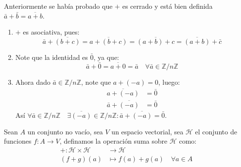 \begin{enefecto}
	Anteriormente se había probado que $+$ es cerrado y está bien definida $\bar{a} + \bar{b} = \overline{a+b}$.

	\begin{enumerate}[label=\roman*), font=\normalfont]
		\item $+$ es asociativa, pues:
		      \begin{equation*}
			      \bar{a} + \overline{(b+c)} = \overline{a+(b+c)} = \overline{(a+b)+c} = \overline{(a+b)} + \bar{c}
		      \end{equation*}
		\item Note que la identidad es $\bar{0}$, ya que:
		      \begin{equation*}
			      \bar{a} + \bar{0} = \overline{a+0} = \bar{a} \quad \forall \bar{a} \in \mathbb{Z}/n\mathbb{Z}
		      \end{equation*}
		\item Ahora dado $\bar{a} \in \mathbb{Z}/n\mathbb{Z}$, note que $a+(-a)=0$, luego:
		      \begin{align*}
			      \overline{a+(-a)}         & = \bar{0} \\
			      \bar{a} + \overline{(-a)} & = \bar{0}
		      \end{align*}
		      Así $\forall \bar{a} \in \mathbb{Z}/n\mathbb{Z} \quad \exists \overline{(-a)} \in \mathbb{Z}/n\mathbb{Z} : \bar{a} + \overline{(-a)} = \bar{0}$.
	\end{enumerate}
\end{enefecto}

\begin{eje}
	Sean $A$ un conjunto no vacío, sea $V$ un espacio vectorial, sea $\mathcal{H}$ el conjunto de funciones $f: A \to V$, definamos la operación suma sobre $\mathcal{H}$ como:
	\begin{align*}
		+: \mathcal{H} \times \mathcal{H} & \to \mathcal{H}                           \\
		(f+g)(a)                          & \mapsto f(a) + g(a) \quad \forall a \in A
	\end{align*}
\end{eje}

